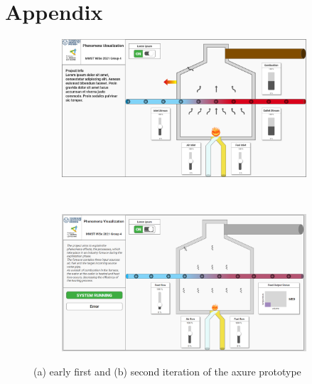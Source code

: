 \section*{Appendix}

\begin{figure}[htp]
    \centering
    \begin{subfigure}{1\textwidth}
        \centering
        \includegraphics[width=0.9\linewidth]{images/concept/prototype/prototype v1.png}
        \caption{}
    \end{subfigure}
    \\[\baselineskip]
    \begin{subfigure}{1\textwidth}
        \centering
        \includegraphics[width=0.9\linewidth]{images/concept/prototype/prototype v2.png}
        \caption{}
    \end{subfigure}
    \caption {(a) early first and (b) second iteration of the axure prototype}
\label{fig:appendix_prototype_early_versions}
\end{figure}

